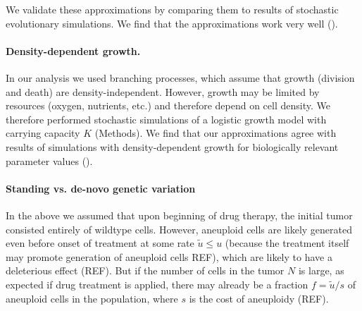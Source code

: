 \documentclass[12pt]{extarticle}
\newcommand{\e}{{\rm e}}
\begin{document}

We validate these approximations by comparing them to results of stochastic evolutionary simulations. We find that the approximations work very well ().

\paragraph*{Density-dependent growth.}

In our analysis we used branching processes, which assume that growth (division and death) are density-independent. However, growth may be limited by resources (oxygen, nutrients, etc.) and therefore depend on cell density. 
We therefore performed stochastic simulations of a logistic growth model with carrying capacity $K$ (Methods). 
We find that our approximations agree with results of simulations with density-dependent growth for biologically relevant parameter values ().

\paragraph*{Standing vs. de-novo genetic variation}

In the above we assumed that upon beginning of drug therapy, the initial tumor consisted entirely of wildtype cells.
However, aneuploid cells are likely generated even before onset of treatment at some rate $\tilde{u} \le u$ (because the treatment itself may promote generation of aneuploid cells REF), which are likely to have a deleterious effect (REF). %
But if the number of cells in the tumor $N$ is large, as expected if drug treatment is applied, there may already be a fraction $f=\tilde{u}/s$ of aneuploid cells in the population, where $s$ is the cost of aneuploidy (REF).
\end{document}

